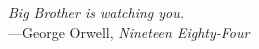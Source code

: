 \vspace*{\fill} %
\begin{flushright}
	\textit{Big Brother is watching you.} \\[1em]
	---George Orwell, \textit{Nineteen Eighty-Four}
\end{flushright}
